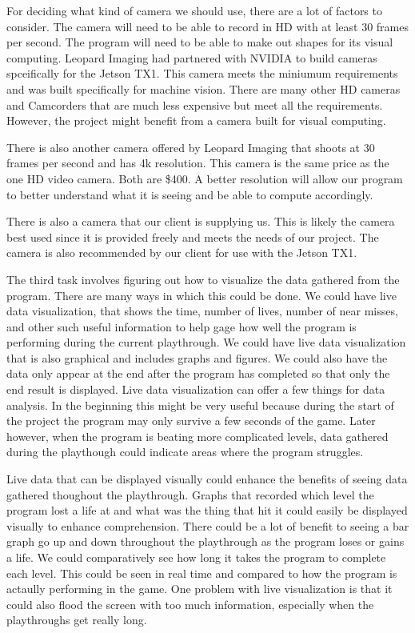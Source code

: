 \documentclass{scrreprt}
\begin{document}
For deciding what kind of camera we should use, there are a lot of factors to consider.
The camera will need to be able to record in HD with at least 30 frames per second.
The program will need to be able to make out shapes for its visual computing.
Leopard Imaging had partnered with NVIDIA to build cameras spceifically for the Jetson TX1.
This camera meets the miniumum requirements and was built specifically for machine vision.
There are many other HD cameras and Camcorders that are much less expensive but meet all the requirements.
However, the project might benefit from a camera built for visual computing.

There is also another camera offered by Leopard Imaging that shoots at 30 frames per second and has 4k resolution.
This camera is the same price as the one HD video camera.
Both are \$400.
A better resolution will allow our program to better understand what it is seeing and be able to compute accordingly.

There is also a camera that our client is supplying us.
This is likely the camera best used since it is provided freely and meets the needs of our project.
The camera is also recommended by our client for use with the Jetson TX1.

The third task involves figuring out how to visualize the data gathered from the program.
There are many ways in which this could be done.
We could have live data visualization, that shows the time, number of lives, number of near misses, and other such useful information to help gage how well the program is performing during the current playthrough.
We could have live data visualization that is also graphical and includes graphs and figures.
We could also have the data only appear at the end after the program has completed so that only the end result is displayed.
Live data visualization can offer a few things for data analysis.
In the beginning this might be very useful because during the start of the project the program may only survive a few seconds of the game.
Later however, when the program is beating more complicated levels, data gathered during the playthough could indicate areas where the program struggles.

Live data that can be displayed visually could enhance the benefits of seeing data gathered thoughout the playthrough.
Graphs that recorded which level the program lost a life at and what was the thing that hit it could easily be displayed visually to enhance comprehension.
There could be a lot of benefit to seeing a bar graph go up and down throughout the playthrough as the program loses or gains a life.
We could comparatively see how long it takes the program to complete each level.
This could be seen in real time and compared to how the program is actaully performing in the game.
One problem with live visualization is that it could also flood the screen with too much information, especially when the playthroughs get really long.
\end{document}
